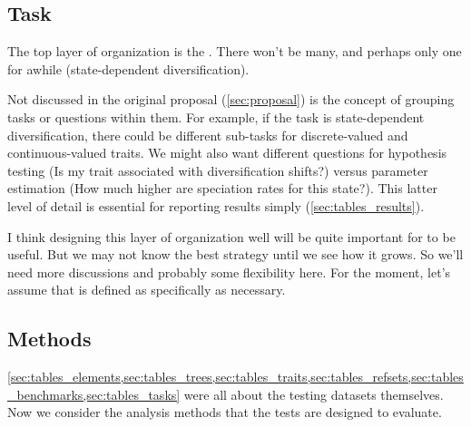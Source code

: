 \subsection{Task}
\label{sec:tables_tasks}

The top layer of organization is the \Task.
There won't be many, and perhaps only one for awhile (\ie state-dependent diversification).

Not discussed in the original proposal (\cref{sec:proposal}) is the concept of grouping tasks or questions within them.
For example, if the task is state-dependent diversification, there could be different sub-tasks for discrete-valued and continuous-valued traits.
We might also want different questions for hypothesis testing (Is my trait associated with diversification shifts?) versus parameter estimation (How much higher are speciation rates for this state?).
This latter level of detail is essential for reporting results simply (\cref{sec:tables_results}).

I think designing this layer of organization well will be quite important for \phycomb to be useful.
But we may not know the best strategy until we see how it grows.
So we'll need more discussions and probably some flexibility here.
For the moment, let's assume that \Task is defined as specifically as necessary.

\subsection{Methods}
\label{sec:tables_methods}

\cref{sec:tables_elements,sec:tables_trees,sec:tables_traits,sec:tables_refsets,sec:tables_benchmarks,sec:tables_tasks} were all about the testing datasets themselves.
Now we consider the analysis methods that the tests are designed to evaluate.

